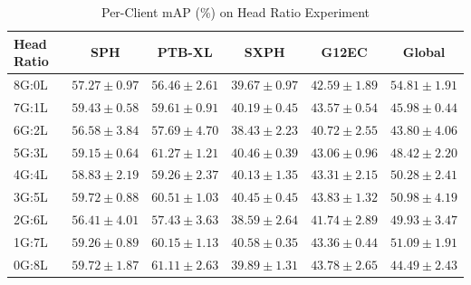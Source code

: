 \documentclass[a4paper]{article}
\begin{document}
\begin{table}[htbp]
  \centering
  \caption{Per-Client mAP (\%) on Head Ratio Experiment}
  \begin{tabular}{l|cccc|c}
    \toprule
    Head Ratio & SPH & PTB-XL & SXPH & G12EC & Global \\
    \midrule
    8G:0L & $57.27 \pm 0.97$ & $56.46 \pm 2.61$ & $39.67 \pm 0.97$ & $42.59 \pm 1.89$ & \textbf{$54.81 \pm 1.91$} \\
    7G:1L & $59.43 \pm 0.58$ & $59.61 \pm 0.91$ & $40.19 \pm 0.45$ & $43.57 \pm 0.54$ & $45.98 \pm 0.44$ \\
    6G:2L & $56.58 \pm 3.84$ & $57.69 \pm 4.70$ & $38.43 \pm 2.23$ & $40.72 \pm 2.55$ & $43.80 \pm 4.06$ \\
    5G:3L & $59.15 \pm 0.64$ & \textbf{$61.27 \pm 1.21$} & $40.46 \pm 0.39$ & $43.06 \pm 0.96$ & $48.42 \pm 2.20$ \\
    4G:4L & $58.83 \pm 2.19$ & $59.26 \pm 2.37$ & $40.13 \pm 1.35$ & $43.31 \pm 2.15$ & $50.28 \pm 2.41$ \\
    3G:5L & \textbf{$59.72 \pm 0.88$} & $60.51 \pm 1.03$ & $40.45 \pm 0.45$ & \textbf{$43.83 \pm 1.32$} & $50.98 \pm 4.19$ \\
    2G:6L & $56.41 \pm 4.01$ & $57.43 \pm 3.63$ & $38.59 \pm 2.64$ & $41.74 \pm 2.89$ & $49.93 \pm 3.47$ \\
    1G:7L & $59.26 \pm 0.89$ & $60.15 \pm 1.13$ & \textbf{$40.58 \pm 0.35$} & $43.36 \pm 0.44$ & $51.09 \pm 1.91$ \\
    0G:8L & \textbf{$59.72 \pm 1.87$} & $61.11 \pm 2.63$ & $39.89 \pm 1.31$ & $43.78 \pm 2.65$ & $44.49 \pm 2.43$ \\
    \bottomrule
  \end{tabular}
\end{table}
\clearpage
\end{document}
